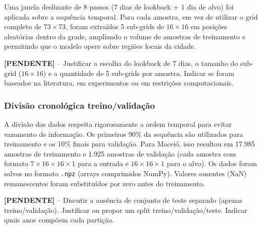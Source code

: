 Uma janela deslizante de 8 passos (7 dias de lookback + 1 dia de alvo) foi aplicada sobre a sequência temporal. Para cada amostra, em vez de utilizar o grid completo de $73 \times 73$, foram extraídos 5 sub-grids de $16 \times 16$ em posições aleatórias dentro da grade, ampliando o volume de amostras de treinamento e permitindo que o modelo opere sobre regiões locais da cidade.

\textbf{[PENDENTE]} -- Justificar a escolha do lookback de 7 dias, o tamanho do sub-grid ($16 \times 16$) e a quantidade de 5 sub-grids por amostra. Indicar se foram baseados na literatura, em experimentos ou em restrições computacionais.

\subsubsection{Divisão cronológica treino/validação}

A divisão dos dados respeita rigorosamente a ordem temporal para evitar vazamento de informação. Os primeiros 90\% da sequência são utilizados para treinamento e os 10\% finais para validação. Para Maceió, isso resultou em 17.985 amostras de treinamento e 1.925 amostras de validação (cada amostra com formato $7 \times 16 \times 16 \times 1$ para a entrada e $16 \times 16 \times 1$ para o alvo). Os dados foram salvos no formato \texttt{.npz} (arrays comprimidos NumPy). Valores ausentes (NaN) remanescentes foram substituídos por zero antes do treinamento.

\textbf{[PENDENTE]} -- Discutir a ausência de conjunto de teste separado (apenas treino/validação). Justificar ou propor um split treino/validação/teste. Indicar quais anos compõem cada partição.


